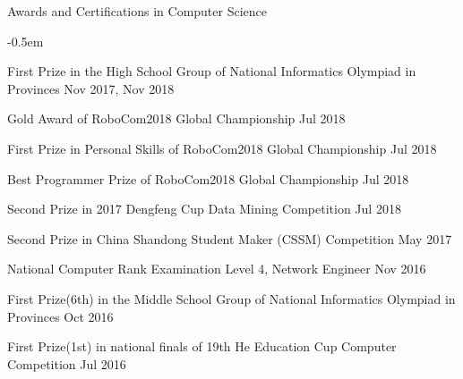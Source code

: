 \documentclass{resume} %
\begin{document}
\begin{rSection}{Awards and Certifications in Computer Science}
    \begin{list}{}{
        \setlength{\leftmargin}{0.0em}
        \itemsep -0.5em
      }

    

    \item First Prize in the High School Group of National Informatics Olympiad in Provinces \hfill Nov 2017, Nov 2018
    \item Gold Award of RoboCom2018 Global Championship \hfill Jul 2018
    \item First Prize in Personal Skills of RoboCom2018 Global Championship \hfill Jul 2018
    \item Best Programmer Prize of RoboCom2018 Global Championship \hfill Jul 2018
    \item Second Prize in 2017 Dengfeng Cup Data Mining Competition \hfill Jul 2018
    \item Second Prize in China Shandong Student Maker (CSSM) Competition \hfill May 2017
    \item National Computer Rank Examination Level 4, Network Engineer \hfill Nov 2016
    \item First Prize(6th) in the Middle School Group of National Informatics Olympiad in Provinces \hfill Oct 2016
    \item First Prize(1st) in national finals of 19th He Education Cup Computer Competition \hfill Jul 2016
    
    \end{list}
\end{rSection}
\end{document}

